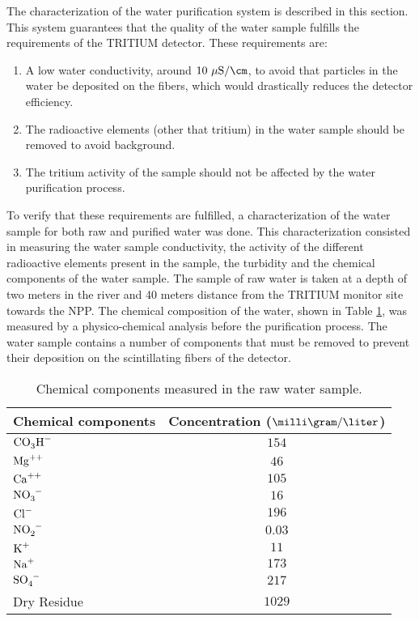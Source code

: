 The characterization of the water purification system is described in this section. This system guarantees that the quality of the water sample fulfills the requirements of the TRITIUM detector. These requirements are:

\begin{enumerate}
\item{} A low water conductivity, around $10~\mu\text{S}/\cm$, to avoid that particles in the water be deposited on the fibers, which would drastically reduces the detector efficiency.

\item{} The radioactive elements (other that tritium) in the water sample should be removed to avoid background.

\item{} The tritium activity of the sample should not be affected by the water purification process. 

\end{enumerate}

To verify that these requirements are fulfilled, a characterization of the water sample for both raw and purified water was done. This characterization consisted in measuring the water sample conductivity, the activity of the different radioactive elements present in the sample, the turbidity and the chemical components of the water sample. The sample of raw water is taken at a depth of two meters in the river and 40 meters distance from the TRITIUM monitor site towards the NPP. The chemical composition of the water, shown in Table \ref{tab:ChemicalComponentsRawWater}, was measured by a physico-chemical analysis before the purification process. The water sample contains a number of components that must be removed to prevent their deposition on the scintillating fibers of the detector.

\begin{table}[htbp]
\centering{}%
\begin{tabular}{lc}
\toprule 
Chemical components & Concentration ($\milli\gram/\liter$) \tabularnewline
\midrule
\midrule 
$\ce{CO_{3}H^-}$ & $154$ \tabularnewline
$\ce{Mg^{++}}$ & $46$ \tabularnewline
$\ce{Ca^{++}}$ & $105$ \tabularnewline
$\ce{NO_{3}^-}$ & $16$ \tabularnewline
$\ce{Cl^-}$ & $196$ \tabularnewline
$\ce{NO_{2}^-}$ & $0.03$ \tabularnewline
$\ce{K^{+}}$ & $11$ \tabularnewline
$\ce{Na^{+}}$ & $173$ \tabularnewline
$\ce{SO_{4}^-}$ & $217$ \tabularnewline
Dry Residue & $1029$ \tabularnewline
\bottomrule
\end{tabular}
\caption{Chemical components measured in the raw water sample.}
\label{tab:ChemicalComponentsRawWater}
\end{table}


